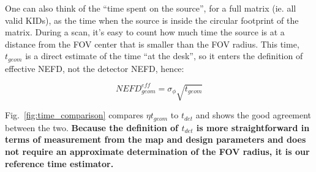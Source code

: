 One can also think of the ``time spent on the source'', for a full matrix
(ie. all valid KIDs), as the time when the source is inside the circular
footprint of the matrix. During a scan, it's easy to count how much time the
source is at a distance from the FOV center that is smaller than the FOV
radius. This time, $t_{geom}$ is a direct estimate of the time ``at the desk'',
so it enters the definition of effective NEFD, not the detector NEFD, hence:

\begin{equation}
NEFD^{eff}_{geom} = \sigma_\phi \sqrt{t_{geom}}
\end{equation}

Fig.~\ref{fig:time_comparison} compares $\eta t_{geom}$ to $t_{det}$ and shows
the good agreement between the two. {\bf Because the definition of $t_{det}$ is more
straightforward in terms of measurement from the map and design parameters and
does not require an approximate determination of the FOV radius, it is our
reference time estimator.}


